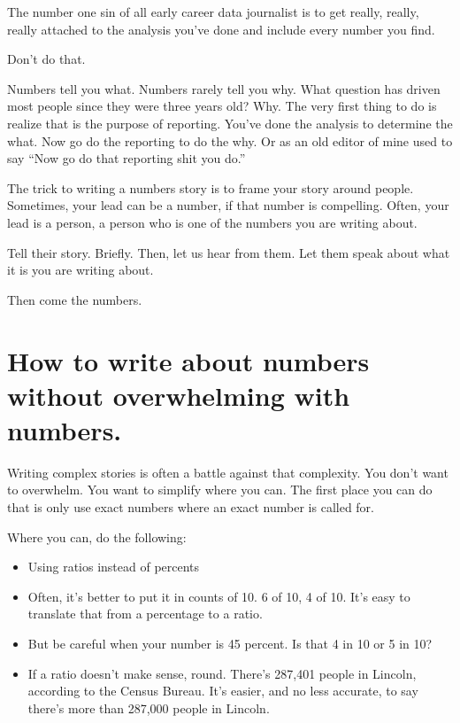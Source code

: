 \documentclass[
  letterpaper,
  DIV=11,
  numbers=noendperiod]{scrreprt}
\providecommand{\tightlist}{%
  \setlength{\itemsep}{0pt}\setlength{\parskip}{0pt}}\usepackage{longtable,booktabs,array}
\begin{document}
The number one sin of all early career data journalist is to get really,
really, really attached to the analysis you've done and include every
number you find.

Don't do that.

Numbers tell you what. Numbers rarely tell you why. What question has
driven most people since they were three years old? Why. The very first
thing to do is realize that is the purpose of reporting. You've done the
analysis to determine the what. Now go do the reporting to do the why.
Or as an old editor of mine used to say ``Now go do that reporting shit
you do.''

The trick to writing a numbers story is to frame your story around
people. Sometimes, your lead can be a number, if that number is
compelling. Often, your lead is a person, a person who is one of the
numbers you are writing about.

Tell their story. Briefly. Then, let us hear from them. Let them speak
about what it is you are writing about.

Then come the numbers.

\hypertarget{how-to-write-about-numbers-without-overwhelming-with-numbers.}{%
\section{How to write about numbers without overwhelming with
numbers.}\label{how-to-write-about-numbers-without-overwhelming-with-numbers.}}

Writing complex stories is often a battle against that complexity. You
don't want to overwhelm. You want to simplify where you can. The first
place you can do that is only use exact numbers where an exact number is
called for.

Where you can, do the following:

\begin{itemize}
\tightlist
\item
  Using ratios instead of percents
\item
  Often, it's better to put it in counts of 10. 6 of 10, 4 of 10. It's
  easy to translate that from a percentage to a ratio.
\item
  But be careful when your number is 45 percent. Is that 4 in 10 or 5 in
  10?
\item
  If a ratio doesn't make sense, round. There's 287,401 people in
  Lincoln, according to the Census Bureau. It's easier, and no less
  accurate, to say there's more than 287,000 people in Lincoln.
\end{itemize}
\end{document}
